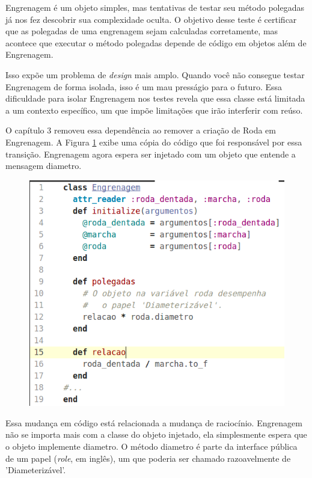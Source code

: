 Engrenagem é um objeto simples, mas tentativas de testar seu método polegadas já
nos fez descobrir sua complexidade oculta. O objetivo desse teste é certificar
que as polegadas de uma engrenagem sejam calculadas corretamente, mas acontece
que executar o método polegadas depende de código em objetos além de Engrenagem.

Isso expõe um problema de \textit{design} mais amplo. Quando você não consegue
testar Engrenagem de forma isolada, isso é um mau presságio para o futuro. Essa
dificuldade para isolar Engrenagem nos testes revela que essa classe está
limitada a um contexto específico, um que impõe limitações que irão
interferir com reúso.

O capítulo 3 removeu essa dependência ao remover a criação de Roda em
Engrenagem. A Figura \ref{img:codigo_pag_205} exibe uma cópia do código que foi
responsável por essa transição. Engrenagem agora espera ser injetado com um
objeto que entende a mensagem diametro.

\begin{figure}[!htbp]
  \center
  \includegraphics[scale=0.50]{imagens/codigo_pag_205.png}
  \label{img:codigo_pag_205}
\end{figure}

Essa mudança em código está relacionada a mudança de raciocínio.
Engrenagem não se importa mais com a classe do objeto injetado, ela simplesmente
espera que o objeto implemente diametro. O método diametro é parte da interface
pública de um papel (\textit{role}, em inglês), um que poderia ser chamado
razoavelmente de 'Diameterizável'.

